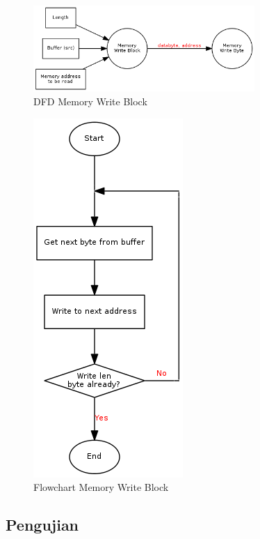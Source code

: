 \begin{figure}[!h]
\centering
\includegraphics[width=0.75\textwidth]{image/memory/dfd_writeblock.png}
\caption{DFD Memory Write Block}
\label{fig-dfd-writeblock}
\end{figure}

\begin{figure}[!h]
\centering
\includegraphics[height=0.5\textheight]{image/memory/flow_writeblock.png}
\caption{Flowchart Memory Write Block}
\label{fig-flow-writeblock}
\end{figure}

\subsection {Pengujian}

